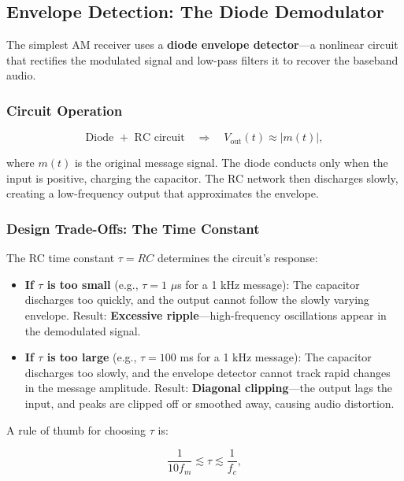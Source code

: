 \documentclass[11pt,letterpaper]{article}
\begin{document}
\subsection{Envelope Detection: The Diode Demodulator}

The simplest AM receiver uses a \textbf{diode envelope detector}—a nonlinear circuit that rectifies the modulated signal and low-pass filters it to recover the baseband audio.

\subsubsection*{Circuit Operation}

\begin{equation}
\text{Diode } + \text{ RC circuit} \quad \Rightarrow \quad V_{\text{out}}(t) \approx |m(t)|,
\end{equation}

\noindent
where $m(t)$ is the original message signal. The diode conducts only when the input is positive, charging the capacitor. The RC network then discharges slowly, creating a low-frequency output that approximates the envelope.

\subsubsection*{Design Trade-Offs: The Time Constant}

The RC time constant $\tau = RC$ determines the circuit's response:

\begin{itemize}
    \item \textbf{If $\tau$ is too small} (e.g., $\tau = 1$ $\mu$s for a 1 kHz message): The capacitor discharges too quickly, and the output cannot follow the slowly varying envelope. Result: \textbf{Excessive ripple}—high-frequency oscillations appear in the demodulated signal.

    \item \textbf{If $\tau$ is too large} (e.g., $\tau = 100$ ms for a 1 kHz message): The capacitor discharges too slowly, and the envelope detector cannot track rapid changes in the message amplitude. Result: \textbf{Diagonal clipping}—the output lags the input, and peaks are clipped off or smoothed away, causing audio distortion.
\end{itemize}

\noindent
A rule of thumb for choosing $\tau$ is:

\begin{equation}
\frac{1}{10 f_m} \lesssim \tau \lesssim \frac{1}{f_c},
\end{equation}
\end{document}
